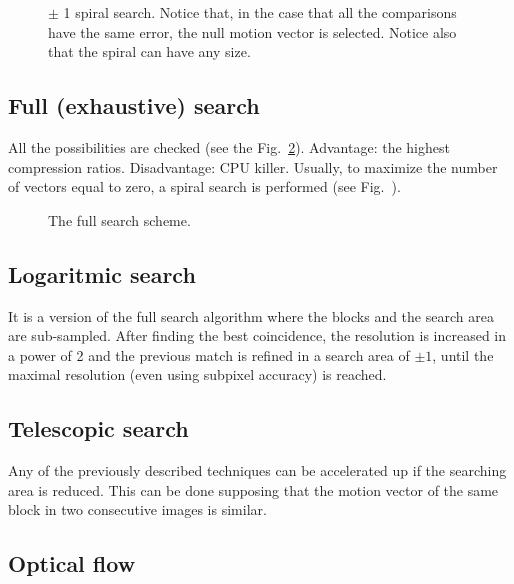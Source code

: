 \begin{figure}
  \caption{$\pm$ 1 spiral search. Notice that, in the case that all the
    comparisons have the same error, the null motion vector is
    selected. Notice also that the spiral can have any size.}
  \label{fig:spiral_search}
\end{figure}

\subsection{Full (exhaustive) search}

All the possibilities are checked (see the
Fig.~\ref{fig:full_search}). Advantage: the highest compression
ratios. Disadvantage: CPU killer. Usually, to maximize the number of
vectors equal to zero, a spiral search is performed (see
Fig.~\cite{fig:spiral_search}).
  
\begin{figure}
  \caption{The full search scheme.}
  \label{fig:full_search}
\end{figure}


\subsection{Logaritmic search}

It is a version of the full search algorithm where the blocks
and the search area are sub-sampled. After finding the best
coincidence, the resolution is increased in a power of 2 and the
previous match is refined in a search area of $\pm 1$, until the
maximal resolution (even using subpixel accuracy) is reached.


\subsection{{Telescopic search}}

Any of the previously described techniques can be accelerated up if
the searching area is reduced. This can be done supposing that the
motion vector of the same block in two consecutive images is similar.


\subsection{Optical flow}

